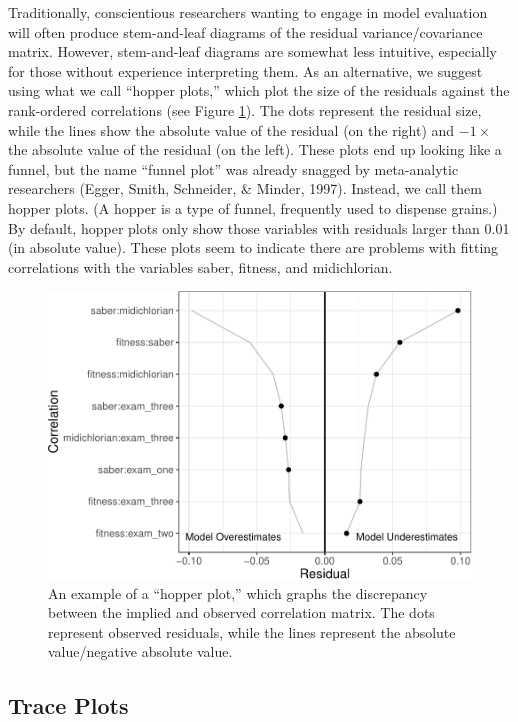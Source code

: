\documentclass[
  english,
  doc]{apa6}
\begin{document}
Traditionally, conscientious researchers wanting to engage in model evaluation will often produce stem-and-leaf diagrams of the residual variance/covariance matrix. However, stem-and-leaf diagrams are somewhat less intuitive, especially for those without experience interpreting them. As an alternative, we suggest using what we call ``hopper plots,'' which plot the size of the residuals against the rank-ordered correlations (see Figure \ref{fig:hopper}). The dots represent the residual size, while the lines show the absolute value of the residual (on the right) and \(-1\times\) the absolute value of the residual (on the left). These plots end up looking like a funnel, but the name ``funnel plot'' was already snagged by meta-analytic researchers (Egger, Smith, Schneider, \& Minder, 1997). Instead, we call them hopper plots. (A hopper is a type of funnel, frequently used to dispense grains.) By default, hopper plots only show those variables with residuals larger than 0.01 (in absolute value). These plots seem to indicate there are problems with fitting correlations with the variables saber, fitness, and midichlorian.

\begin{figure}
\centering
\includegraphics{flexplavaan_draft_files/figure-latex/hopper-1.pdf}
\caption{\label{fig:hopper}An example of a ``hopper plot,'' which graphs the discrepancy between the implied and observed correlation matrix. The dots represent observed residuals, while the lines represent the absolute value/negative absolute value.}
\end{figure}

\hypertarget{trace-plots}{%
\subsection{Trace Plots}\label{trace-plots}}
\end{document}

